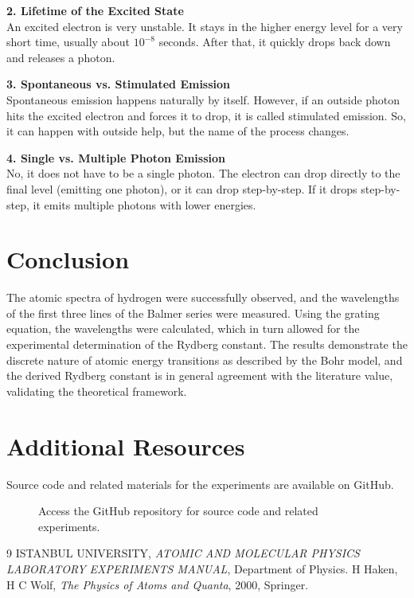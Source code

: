 \documentclass[journal]{IEEEtran}
\begin{document}
\textbf{2. Lifetime of the Excited State} \\
An excited electron is very unstable. It stays in the higher energy level for a very short time, usually about $10^{-8}$ seconds. After that, it quickly drops back down and releases a photon.

\textbf{3. Spontaneous vs. Stimulated Emission} \\
Spontaneous emission happens naturally by itself. However, if an outside photon hits the excited electron and forces it to drop, it is called stimulated emission. So, it can happen with outside help, but the name of the process changes.

\textbf{4. Single vs. Multiple Photon Emission} \\
No, it does not have to be a single photon. The electron can drop directly to the final level (emitting one photon), or it can drop step-by-step. If it drops step-by-step, it emits multiple photons with lower energies.

\section{Conclusion}
The atomic spectra of hydrogen were successfully observed, and the wavelengths of the first three lines of the Balmer series were measured. Using the grating equation, the wavelengths were calculated, which in turn allowed for the experimental determination of the Rydberg constant. The results demonstrate the discrete nature of atomic energy transitions as described by the Bohr model, and the derived Rydberg constant is in general agreement with the literature value, validating the theoretical framework.

\section{Additional Resources}
Source code and related materials for the experiments are available on GitHub.

\begin{figure}[H]
    \centering
    \begin{minipage}{0.15\textwidth}
        \centering
    \end{minipage}%
    \begin{minipage}{0.2\textwidth}
        \raggedright
        \caption{Access the GitHub repository for source code and related experiments.}
        \label{fig:qr_code}
    \end{minipage}
\end{figure}

\begin{thebibliography}{9}
    ISTANBUL UNIVERSITY, \textit{ATOMIC AND MOLECULAR PHYSICS LABORATORY EXPERIMENTS MANUAL}, Department of Physics.
    H Haken, H C Wolf, \textit{The Physics of Atoms and Quanta}, 2000, Springer.
\end{thebibliography}
\end{document}
